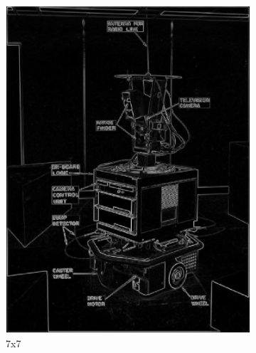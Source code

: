 \documentclass[lettersize,journal]{IEEEtran}
\begin{document}
\begin{figure}[h]
\begin{subfigure}[h]{0.115\textwidth}
        \includegraphics[width=\linewidth]{gaussian_edge_map_7x7_sigma_1}
        \caption{7x7}  
    \end{subfigure}
    \begin{subfigure}[h]{0.115\textwidth}
        \centering

\end{subfigure}
\end{figure}
\end{document}
